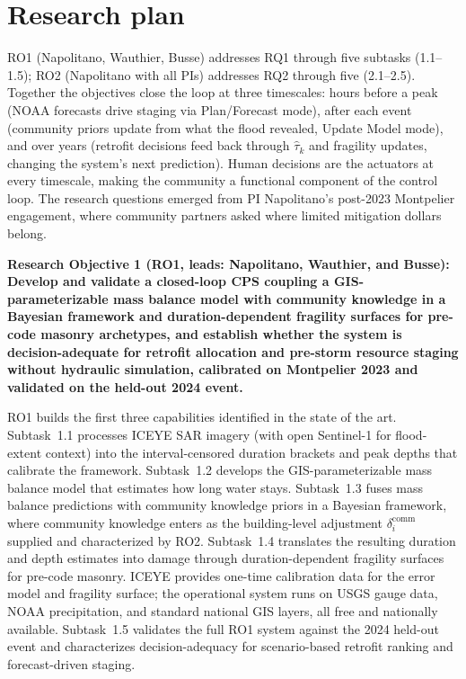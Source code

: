 \documentclass[11pt]{article}
\begin{document}

\section{Research plan}
RO1 (Napolitano, Wauthier, Busse) addresses RQ1 through five subtasks (1.1--1.5); RO2 (Napolitano with all PIs) addresses RQ2 through five (2.1--2.5). Together the objectives close the loop at three timescales: hours before a peak (NOAA forecasts drive staging via Plan/Forecast mode), after each event (community priors update from what the flood revealed, Update Model mode), and over years (retrofit decisions feed back through $\hat{\tau}_k$ and fragility updates, changing the system's next prediction). Human decisions are the actuators at every timescale, making the community a functional component of the control loop. The research questions emerged from PI Napolitano's post-2023 Montpelier engagement, where community partners asked where limited mitigation dollars belong.

\begin{tcolorbox}[colback=mycmykcolor,colframe=black,boxrule=1pt,coltext=black,
  left=1mm,right=1mm,top=1mm,bottom=1mm]
\textbf{Research Objective 1 (RO1, leads: Napolitano, Wauthier, and Busse):
Develop and validate a closed-loop CPS coupling a GIS-parameterizable mass balance
model with community knowledge in a Bayesian framework and duration-dependent
fragility surfaces for pre-code masonry archetypes, and establish whether the system
is decision-adequate for retrofit allocation and pre-storm resource staging without
hydraulic simulation, calibrated on Montpelier 2023 and validated on the held-out
2024 event.}
\end{tcolorbox}

RO1 builds the first three capabilities identified in the state of the art.
Subtask~1.1 processes ICEYE SAR imagery (with open Sentinel-1 for flood-extent
context) into the interval-censored duration brackets and peak depths that
calibrate the framework. Subtask~1.2 develops the GIS-parameterizable mass balance
model that estimates how long water stays. Subtask~1.3 fuses mass balance
predictions with community knowledge priors in a Bayesian framework, where
community knowledge enters as the building-level adjustment
$\delta_i^{\mathrm{comm}}$ supplied and characterized by RO2. Subtask~1.4
translates the resulting duration and depth estimates into damage through
duration-dependent fragility surfaces for pre-code masonry.
ICEYE provides one-time calibration data for the error model and fragility
surface; the operational system runs on USGS gauge data, NOAA
precipitation, and standard national GIS layers, all free and nationally
available.
Subtask~1.5 validates the full RO1 system against the 2024 held-out event and
characterizes decision-adequacy for scenario-based retrofit ranking and forecast-driven staging.
\end{document}
